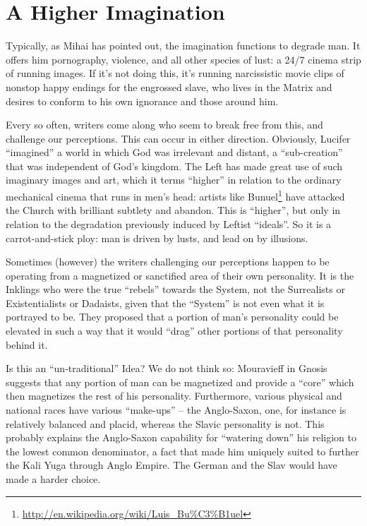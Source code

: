 \section{A Higher Imagination}

Typically, as Mihai has pointed out, the imagination functions to degrade man. It offers him pornography, violence, and all other species of lust: a 24/7 cinema strip of running images. If it's not doing this, it's running narcissistic movie clips of nonstop happy endings for the engrossed slave, who lives in the Matrix and desires to conform to his own ignorance and those around him.

Every so often, writers come along who seem to break free from this, and challenge our perceptions. This can occur in either direction. Obviously, Lucifer ``imagined'' a world in which God was irrelevant and distant, a ``sub-creation'' that was independent of God's kingdom. The Left has made great use of such imaginary images and art, which it terms ``higher'' in relation to the ordinary mechanical cinema that runs in men's head: artists like Bunuel\footnote{\url{http://en.wikipedia.org/wiki/Luis_Bu\%C3\%B1uel}} have attacked the Church with brilliant subtlety and abandon. This is ``higher'', but only in relation to the degradation previously induced by Leftist ``ideals''. So it is a carrot-and-stick ploy: man is driven by lusts, and lead on by illusions.

Sometimes (however) the writers challenging our perceptions happen to be operating from a magnetized or sanctified area of their own personality. It is the Inklings who were the true ``rebels'' towards the System, not the Surrealists or Existentialists or Dadaists, given that the ``System'' is not even what it is portrayed to be. They proposed that a portion of man's personality could be elevated in such a way that it would ``drag'' other portions of that personality behind it.

Is this an ``un-traditional'' Idea? We do not think so: Mouravieff in Gnosis suggests that any portion of man can be magnetized and provide a ``core'' which then magnetizes the rest of his personality. Furthermore, various physical and national races have various ``make-ups'' -- the Anglo-Saxon, one, for instance is relatively balanced and placid, whereas the Slavic personality is not. This probably explains the Anglo-Saxon capability for ``watering down'' his religion to the lowest common denominator, a fact that made him uniquely suited to further the Kali Yuga through Anglo Empire. The German and the Slav would have made a harder choice.

